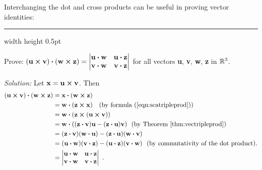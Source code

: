 Interchanging the dot and cross products can be useful in proving vector identities:

\vspace{3mm}
\hrule width \textwidth height 0.5pt
\begin{exmp}\label{exmp:quadcrossdot}
 Prove: $(\textbf{u} \bm{\times} \textbf{v}) \bm{\cdot} (\textbf{w} \bm{\times} \textbf{z}) =
 \begin{vmatrix}
   \textbf{u} \bm{\cdot} \textbf{w} & \textbf{u} \bm{\cdot} \textbf{z}\\
   \textbf{v} \bm{\cdot} \textbf{w} & \textbf{v} \bm{\cdot} \textbf{z}\end{vmatrix}$ for all vectors \textbf{u},
   \textbf{v}, \textbf{w}, \textbf{z} in $\mathbb{R}^{3}$.\vspace{0.5mm}
 \par\noindent\emph{Solution:} Let $\textbf{x} = \textbf{u} \bm{\times} \textbf{v}$. Then
 \begin{align*}
  (\textbf{u} \bm{\times} \textbf{v}) \bm{\cdot} (\textbf{w} \bm{\times} \textbf{z}) &=
   \textbf{x} \bm{\cdot} (\textbf{w} \bm{\times} \textbf{z})\\
  &= \textbf{w} \bm{\cdot} (\textbf{z} \bm{\times} \textbf{x}) \text{~~~(by formula (\ref{eqn:scatripleprod}))}\\
  &= \textbf{w} \bm{\cdot} (\textbf{z} \bm{\times} (\textbf{u} \bm{\times} \textbf{v}))\\
  &= \textbf{w} \bm{\cdot} ((\textbf{z} \bm{\cdot} \textbf{v})\textbf{u} -
   (\textbf{z} \bm{\cdot} \textbf{u})\textbf{v}) \text{~~(by Theorem \ref{thm:vectripleprod})}\\
  &= (\textbf{z} \bm{\cdot} \textbf{v})(\textbf{w} \bm{\cdot} \textbf{u}) -
  (\textbf{z} \bm{\cdot} \textbf{u})(\textbf{w} \bm{\cdot} \textbf{v})\\
  &= (\textbf{u} \bm{\cdot} \textbf{w})(\textbf{v} \bm{\cdot} \textbf{z}) -
  (\textbf{u} \bm{\cdot} \textbf{z})(\textbf{v} \bm{\cdot} \textbf{w}) \text{~~(by commutativity of the dot product).}\\
  &= \begin{vmatrix}
   \textbf{u} \bm{\cdot} \textbf{w} & \textbf{u} \bm{\cdot} \textbf{z}\\
   \textbf{v} \bm{\cdot} \textbf{w} & \textbf{v} \bm{\cdot} \textbf{z}\end{vmatrix}~.
 \end{align*}
\end{exmp}\vspace{-7.5mm}
\startexercises\label{sec1dot4}
